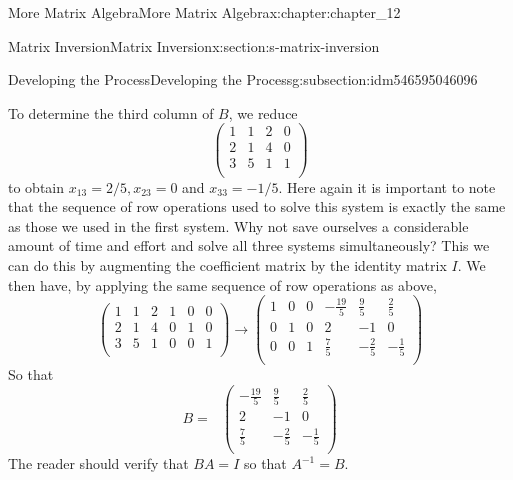 \documentclass[oneside,10pt,]{book}
\numberwithin{equation}{section}
\begin{document}
\begin{chapterptx}{More Matrix Algebra}{}{More Matrix Algebra}{}{}{x:chapter:chapter_12}
\begin{sectionptx}{Matrix Inversion}{}{Matrix Inversion}{}{}{x:section:s-matrix-inversion}
\begin{subsectionptx}{Developing the Process}{}{Developing the Process}{}{}{g:subsection:idm546595046096}
\par
To determine the third column of \(B\), we reduce%
\begin{equation*}
\left(
\begin{array}{ccc|c}
1 & 1 & 2 & 0 \\
2 & 1 & 4 & 0 \\
3 & 5 & 1 & 1 \\
\end{array}
\right)
\end{equation*}
to obtain \(x_{13}= 2/5, x_{23}=0\) and \(x_{33}=-1/5\). Here again it is important to note that the sequence of row operations used to solve this system is exactly the same as those we used in the first system. Why not save ourselves a considerable amount of time and effort and solve all three systems simultaneously? This we can do this by augmenting the coefficient matrix by the identity matrix \(I\). We then have, by applying the same sequence of row operations as above,%
\begin{equation*}
\left(
\begin{array}{ccc|ccc}
1 & 1 & 2 & 1 & 0 & 0 \\
2 & 1 & 4 & 0 & 1 & 0 \\
3 & 5 & 1 & 0 & 0 & 1 \\
\end{array}
\right)\longrightarrow
\left(
\begin{array}{ccc|ccc}
1 & 0 & 0 & -\frac{19}{5} & \frac{9}{5} & \frac{2}{5} \\
0 & 1 & 0 & 2 & -1 & 0 \\
0 & 0 & 1 & \frac{7}{5} & -\frac{2}{5} & -\frac{1}{5} \\
\end{array}
\right)
\end{equation*}
So that%
\begin{equation*}
B =\textrm{    }\left(
\begin{array}{ccc}
-\frac{19}{5} & \frac{9}{5} & \frac{2}{5} \\
2 & -1 & 0 \\
\frac{7}{5} & -\frac{2}{5} & -\frac{1}{5} \\
\end{array}
\right)
\end{equation*}
The reader should verify that \(B A = I\) so that \(A ^{-1} = B\).%
\end{subsectionptx}
%
%
\typeout{************************************************}
\typeout{************************************************}

\end{sectionptx}
\end{chapterptx}
\end{document}
